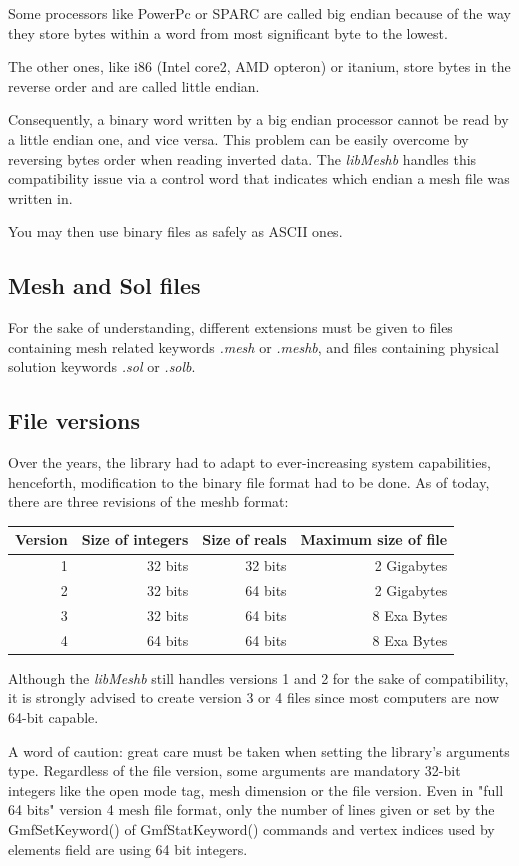 \documentclass[a4paper,12pt]{article}
\begin{document}
Some processors like PowerPc or SPARC are called big endian because of the way they store bytes within a word from most significant byte to the lowest.

The other ones, like i86 (Intel core2, AMD opteron) or itanium, store bytes in the reverse order and are called little endian.

Consequently, a binary word written by a big endian processor cannot be read by a little endian one, and vice versa. This problem can be easily overcome by reversing bytes order when reading inverted data. The \emph{libMeshb} handles this compatibility issue via a control word that indicates which endian a mesh file was written in.

You may then use binary files as safely as ASCII ones.

\subsection{Mesh and Sol files}
For the sake of understanding, different extensions must be given to files containing mesh related keywords \emph{.mesh} or \emph{.meshb}, and files containing physical solution keywords \emph{.sol} or \emph{.solb}.

\subsection{File versions}
Over the years, the library had to adapt to ever-increasing system capabilities, henceforth, modification to the binary file format had to be done. As of today, there are three revisions of the meshb format:
\medskip

\begin{tabular}{|r|r|r|r|}
\hline
Version & Size of integers & Size of reals & Maximum size of file \\
\hline
1 & 32 bits & 32 bits & 2 Gigabytes \\
\hline
2 & 32 bits & 64 bits & 2 Gigabytes \\
\hline
3 & 32 bits & 64 bits & 8 Exa Bytes \\
\hline
4 & 64 bits & 64 bits & 8 Exa Bytes \\
\hline
\end{tabular}
\medskip

Although the \emph{libMeshb} still handles versions 1 and 2 for the sake of compatibility, it is strongly advised to create version 3 or 4 files since most computers are now 64-bit capable.

A word of caution: great care must be taken when setting the library's arguments type. Regardless of the file version, some arguments are mandatory 32-bit integers like the open mode tag, mesh dimension or the file version. Even in "full 64 bits" version 4 mesh file format, only the number of lines given or set by the GmfSetKeyword() of GmfStatKeyword() commands and vertex indices used by elements field are using 64 bit integers.
\end{document}
